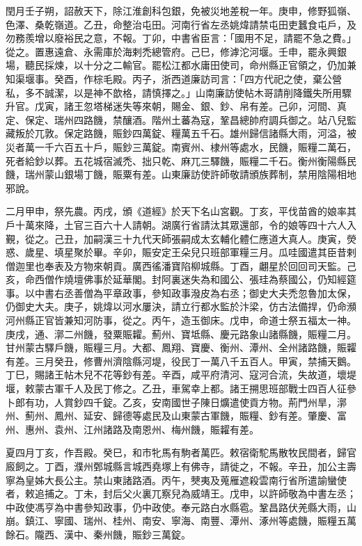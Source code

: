 \begin{pinyinscope}
 閏月壬子朔，詔赦天下，除江淮創科包銀，免被災地差稅一年。庚申，修野狐嶺、色澤、桑乾嶺道。乙丑，命整治屯田。河南行省左丞姚煒請禁屯田吏蠶食屯戶，及勿務羨增以廢裕民之意，不報。丁卯，中書省臣言：「國用不足，請罷不急之費。」從之。置惠遠倉、永需庫於海剌禿總管府。己巳，修滹沱河堰。壬申，罷永興銀場，聽民採煉，以十分之二輸官。罷松江都水庸田使司，命州縣正官領之，仍加兼知渠堰事。癸酉，作棕毛殿。丙子，浙西道廉訪司言：「四方代祀之使，棄公營私，多不誠潔，以是神不歆格，請慎擇之。」山南廉訪使帖木哥請削降鐵失所用驟升官。戊寅，諸王忽塔梯迷失等來朝，賜金、銀、鈔、帛有差。己卯，河間、真定、保定、瑞州四路饑，禁釀酒。階州土蕃為寇，鞏昌總帥府調兵御之。站八兒監藏叛於兀敦。保定路饑，賑鈔四萬錠、糧萬五千石。雄州歸信諸縣大雨，河溢，被災者萬一千六百五十戶，賑鈔三萬錠。南賓州、棣州等處水，民饑，賑糧二萬石，死者給鈔以葬。五花城宿滅禿、拙只乾、麻兀三驛饑，賑糧二千石。衡州衡陽縣民饑，瑞州蒙山銀場丁饑，賑粟有差。山東廉訪使許師敬請頒族葬制，禁用陰陽相地邪說。



 二月甲申，祭先農。丙戌，頒《道經》於天下名山宮觀。丁亥，平伐苗酋的娘率其戶十萬來降，土官三百六十人請朝。湖廣行省請汰其眾還部，令的娘等四十六人入覲，從之。己丑，加嗣漢三十九代天師張嗣成太玄輔化體仁應道大真人。庚寅，熒惑、歲星、填星聚於畢。辛卯，賑安定王朵兒只班部軍糧三月。瓜哇國遣其臣昔剌僧迦里也奉表及方物來朝貢。廣西徭潘寶陷柳城縣。丁酉，翽星於回回司天監。己亥，命西僧作燒壇佛事於延華閣。封阿裏迷失為和國公、張珪為蔡國公，仍知經筵事。以中書右丞善僧為平章政事，參知政事潑皮為右丞；御史大夫禿忽魯加太保，仍御史大夫。庚子，姚煒以河水屢決，請立行都水監於汴梁，仿古法備捍，仍命瀕河州縣正官皆兼知河防事，從之。丙午，造玉御床。戊申，命道士祭五福太一神。庚戌，通、漷二州饑，發粟賑糶。薊州、寶坻縣、慶元路象山諸縣饑，賑糧二月。甘州蒙古驛戶饑，賑糧三月。大都、鳳翔、寶慶、衡州、潭州、全州諸路饑，賑糶有差。三月癸丑，修曹州濟陰縣河堤，役民丁一萬八千五百人。甲寅，禁捕天鵝。丁巳，賜諸王帖木兒不花等鈔有差。辛酉，咸平府清河、寇河合流，失故道，壞堤堰，敕蒙古軍千人及民丁修之。乙丑，車駕幸上都。諸王搠思班部戰士四百人征參卜郎有功，人賞鈔四千錠。乙亥，安南國世子陳日爌遣使貢方物。荊門州旱，漷州、薊州、鳳州、延安、歸德等處民及山東蒙古軍饑，賑糧、鈔有差。肇慶、富州、惠州、袁州、江州諸路及南恩州、梅州饑，賑糶有差。



 夏四月丁亥，作吾殿。癸巳，和市牝馬有駒者萬匹。敕宿衛駝馬散牧民間者，歸官廄飼之。丁酉，濮州鄄城縣言城西堯塚上有佛寺，請徙之，不報。辛丑，加公主壽寧為皇姊大長公主。禁山東諸路酒。丙午，僰夷及蒐雁遮殺雲南行省所遣諭蠻使者，敕追捕之。丁未，封后父火裏兀察兒為威靖王。戊申，以許師敬為中書左丞；中政使馮亨為中書參知政事，仍中政使。奉元路白水縣雹。鞏昌路伏羌縣大雨，山崩。鎮江、寧國、瑞州、桂州、南安、寧海、南豐、潭州、涿州等處饑，賑糧五萬餘石。隴西、漢中、秦州饑，賑鈔三萬錠。




\end{pinyinscope}

